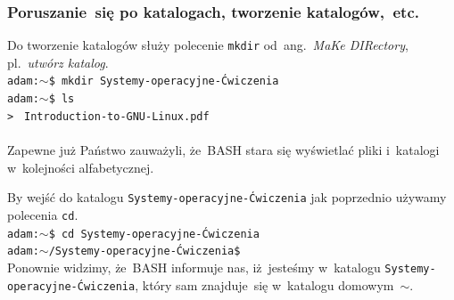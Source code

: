\documentclass[10pt,t]{beamer}
\begin{document}
\begin{frame}
  \frametitle{Poruszanie~się po katalogach, tworzenie
    katalogów,~etc.}


  Do tworzenie katalogów służy polecenie \texttt{mkdir}
  od~ang.~\textit{MaKe DIRectory}, pl.~\textit{utwórz katalog}. \\
  \texttt{adam:$\sim$\$ mkdir Systemy-operacyjne-Ćwiczenia} \\
  \texttt{adam:$\sim$\$ ls } \\
  \texttt{> } \quad
  \texttt{Introduction-to-GNU-Linux.pdf} \quad
  \texttt{} \\
  \texttt{\hphantom{>} } \\
  Zapewne już Państwo zauważyli, że~BASH stara się wyświetlać pliki
  i~katalogi w~kolejności alfabetycznej.

  By wejść do katalogu \texttt{Systemy-operacyjne-Ćwiczenia} jak poprzednio
  używamy polecenia \texttt{cd}. \\
  \texttt{adam:$\sim$\$ cd Systemy-operacyjne-Ćwiczenia} \\
  \texttt{adam:$\sim$/Systemy-operacyjne-Ćwiczenia\$} \\
  Ponownie widzimy, że~BASH informuje nas, iż~jesteśmy w~katalogu
  \texttt{Systemy-operacyjne-Ćwiczenia}, który sam znajduje~się
  w~katalogu domowym~\texttt{$\sim$}.

\end{frame}
\end{document}
